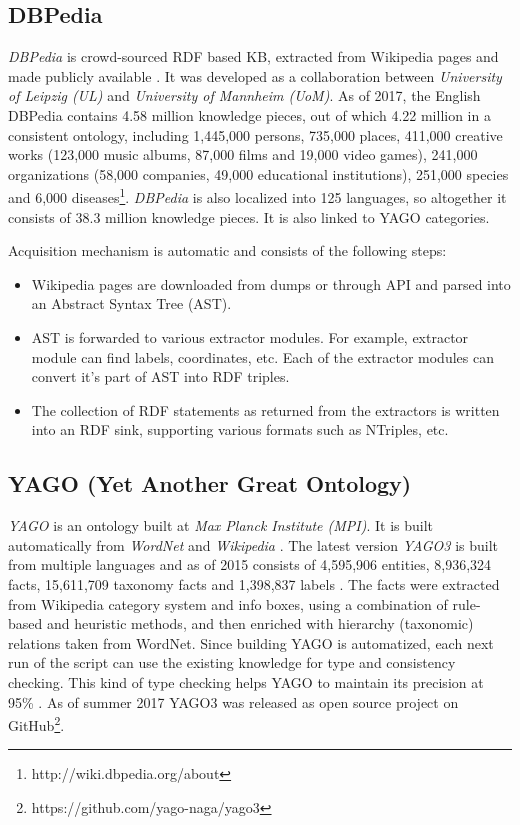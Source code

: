 \subsection{DBPedia}
\label{section:r:dbpedia}
\emph{DBPedia} is crowd-sourced RDF based KB, extracted from Wikipedia pages and made publicly available \parencite{Lehmann2015}. It was developed as a 
collaboration between \emph{University of Leipzig (UL)} and \emph{University of
Mannheim (UoM)}. As of 2017, the English DBPedia contains 4.58 million 
knowledge pieces, out of which 4.22 million in a consistent ontology, 
including 1,445,000 persons, 735,000 places, 411,000 creative works
(123,000 music albums, 87,000 films and 19,000 video games), 
241,000 organizations (58,000 companies, 49,000 educational institutions), 
251,000 species and 6,000 diseases\footnote{http://wiki.dbpedia.org/about}.
\emph{DBPedia} is also localized into 125 languages, so altogether it 
consists of 38.3 million knowledge pieces. It is also linked to YAGO categories.

Acquisition mechanism is automatic and consists of the following steps:
\begin{itemize}
\item Wikipedia pages are downloaded from dumps or through API and parsed into
an Abstract Syntax Tree (AST).
\item  AST is forwarded to various extractor modules. For example, extractor
module can find labels, coordinates, etc. Each of the extractor modules can
convert it's part of AST into RDF triples.
\item The collection of RDF statements as returned from the extractors is 
written into an RDF sink, supporting various formats such as NTriples, etc.
\end{itemize}

\subsection{YAGO (Yet Another Great Ontology)}
\label{section:r:yago}
\emph{YAGO} is an ontology built at \emph{Max Planck Institute (MPI)}. It is built automatically from \emph{WordNet} and 
\emph{Wikipedia} \parencite{Suchanek2008}. The latest version \emph{YAGO3} is built
from multiple languages and as of 2015 consists of 4,595,906 entities, 
8,936,324 facts, 15,611,709 taxonomy facts and 1,398,837 labels
\parencite{Mahdisoltani2015}.
The facts were extracted from Wikipedia category system and info boxes, using
a combination of rule-based and heuristic methods, and then enriched with 
hierarchy (taxonomic) relations taken from WordNet. Since building
YAGO is automatized, each next run of the script can use the existing knowledge
for type and consistency checking. This kind of type checking helps YAGO to
maintain its precision at 95\% \parencite{Suchanek2008}. As of summer 2017
YAGO3 \parencite{Rebele2016} was released as open source project on 
GitHub\footnote{https://github.com/yago-naga/yago3}.

